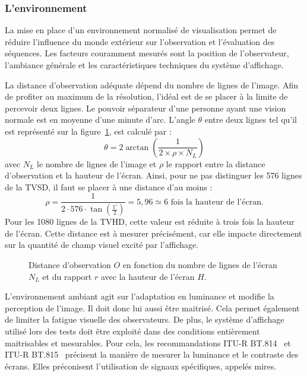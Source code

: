 \subsubsection{L'environnement} \label{tests:environnement}
La mise en place d'un environnement normalisé de visualisation permet de réduire l'influence du monde extérieur sur l'observation et l'évaluation des séquences. Les facteurs couramment mesurés sont la position de l'observateur, l'ambiance générale et les caractéristiques techniques du système d'affichage.

La distance d'observation adéquate dépend du nombre de lignes de l'image. Afin de profiter au maximum de la résolution, l'idéal est de se placer à la limite de percevoir deux lignes. Le pouvoir séparateur d'une personne ayant une vision normale est en moyenne d'une minute d'arc. L'angle $\theta$ entre deux lignes tel qu'il est représenté sur la figure~\ref{fig:visualAngle}, est calculé par :
\begin{equation}
\theta = 2 \arctan\left(\frac{1}{2\times \rho\times N_L}\right)
\end{equation}
%
avec $N_L$ le nombre de lignes de l'image et $\rho$ le rapport entre la distance d'observation et la hauteur de l'écran. Ainsi, pour ne pas distinguer les 576 lignes de la TVSD, il faut se placer à une distance d'au moins :
\begin{equation}
\rho = \frac{1}{2\cdot 576\cdot \tan\left(\frac{1'}{2}\right)} = 5,96 \simeq 6 \text{ fois la hauteur de l'écran.}
\end{equation}
%
Pour les 1080 lignes de la TVHD, cette valeur est réduite à trois fois la hauteur de l'écran. Cette distance est à mesurer précisément, car elle impacte directement sur la quantité de champ visuel excité par l'affichage.%

\begin{figure}[htbp]
	\centering
	\begin{tikzpicture}[thick,scale=2.5]\end{tikzpicture}
	\caption{Distance d'observation $O$ en fonction du nombre de lignes de l'écran $N_L$ et du rapport $r$ avec la hauteur de l'écran $H$.}
	\label{fig:visualAngle}
\end{figure}

L'environnement ambiant agit sur l'adaptation en luminance et modifie la perception de l'image. Il doit donc lui aussi être maitrisé. Cela permet également de limiter la fatigue visuelle des observateurs. De plus, le système d'affichage utilisé lors des tests doit être exploité dans des conditions entièrement maitrisables et mesurables. Pour cela, les recommandations ITU-R BT.814~\cite{itu-bt814-1} et ITU-R BT.815~\cite{itu-bt815-1} précisent la manière de mesurer la luminance et le contraste des écrans. Elles préconisent l'utilisation de signaux spécifiques, appelés mires.


